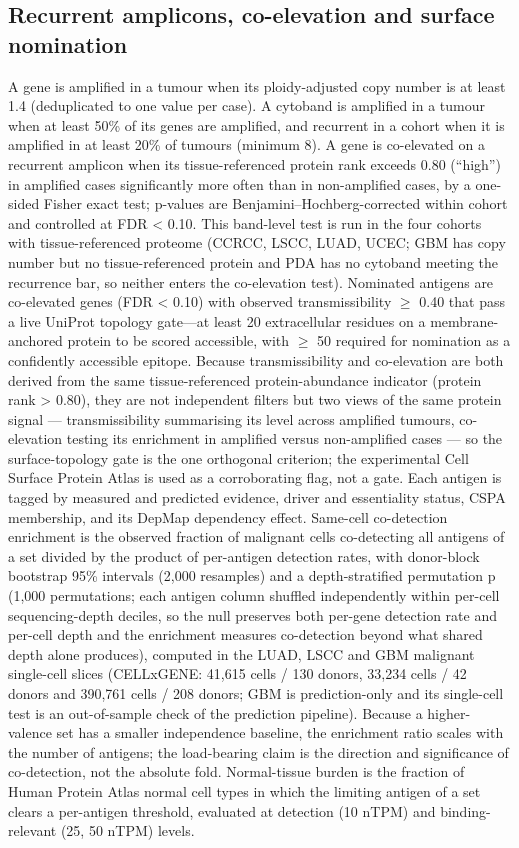 \documentclass[times, twoside]{zHenriquesLab-StyleBioRxiv}
\begin{document}
\subsection*{Recurrent amplicons, co-elevation and surface nomination}
A gene is amplified in a tumour when its ploidy-adjusted copy number is at least 1.4 (deduplicated to one value per case). A cytoband is amplified in a tumour when at least 50\% of its genes are amplified, and recurrent in a cohort when it is amplified in at least 20\% of tumours (minimum 8). A gene is co-elevated on a recurrent amplicon when its tissue-referenced protein rank exceeds 0.80 (``high'') in amplified cases significantly more often than in non-amplified cases, by a one-sided Fisher exact test; p-values are Benjamini--Hochberg-corrected within cohort and controlled at FDR < 0.10. This band-level test is run in the four cohorts with tissue-referenced proteome (CCRCC, LSCC, LUAD, UCEC; GBM has copy number but no tissue-referenced protein and PDA has no cytoband meeting the recurrence bar, so neither enters the co-elevation test). Nominated antigens are co-elevated genes (FDR < 0.10) with observed transmissibility $\geq$ 0.40 that pass a live UniProt topology gate---at least 20 extracellular residues on a membrane-anchored protein to be scored accessible, with $\geq$ 50 required for nomination as a confidently accessible epitope. Because transmissibility and co-elevation are both derived from the same tissue-referenced protein-abundance indicator (protein rank > 0.80), they are not independent filters but two views of the same protein signal --- transmissibility summarising its level across amplified tumours, co-elevation testing its enrichment in amplified versus non-amplified cases --- so the surface-topology gate is the one orthogonal criterion; the experimental Cell Surface Protein Atlas\cite{ref20} is used as a corroborating flag, not a gate. Each antigen is tagged by measured and predicted evidence, driver and essentiality status, CSPA membership, and its DepMap dependency effect. Same-cell co-detection enrichment is the observed fraction of malignant cells co-detecting all antigens of a set divided by the product of per-antigen detection rates, with donor-block bootstrap 95\% intervals (2,000 resamples) and a depth-stratified permutation p (1,000 permutations; each antigen column shuffled independently within per-cell sequencing-depth deciles, so the null preserves both per-gene detection rate and per-cell depth and the enrichment measures co-detection beyond what shared depth alone produces), computed in the LUAD, LSCC and GBM malignant single-cell slices (CELLxGENE: 41,615 cells / 130 donors, 33,234 cells / 42 donors and 390,761 cells / 208 donors; GBM is prediction-only and its single-cell test is an out-of-sample check of the prediction pipeline). Because a higher-valence set has a smaller independence baseline, the enrichment ratio scales with the number of antigens; the load-bearing claim is the direction and significance of co-detection, not the absolute fold. Normal-tissue burden is the fraction of Human Protein Atlas normal cell types in which the limiting antigen of a set clears a per-antigen threshold, evaluated at detection (10 nTPM) and binding-relevant (25, 50 nTPM) levels.
\end{document}
